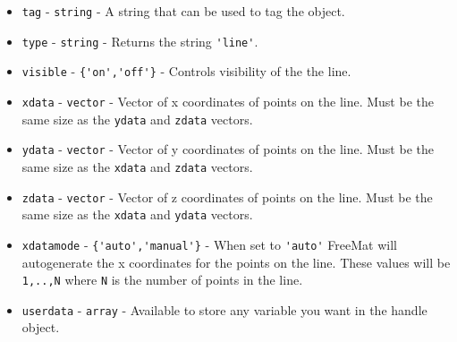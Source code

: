 \begin{itemize}
\item  \verb|tag| - \verb|string| - A string that can be used to tag the object.

\item  \verb|type| - \verb|string| - Returns the string \verb|'line'|.

\item  \verb|visible| - \verb|{'on','off'}| - Controls visibility of the the line.

\item  \verb|xdata| - \verb|vector| - Vector of x coordinates of points on the line.  Must be
 the same size as the \verb|ydata| and \verb|zdata| vectors.

\item  \verb|ydata| - \verb|vector| - Vector of y coordinates of points on the line.  Must be
 the same size as the \verb|xdata| and \verb|zdata| vectors.

\item  \verb|zdata| - \verb|vector| - Vector of z coordinates of points on the line.  Must be
 the same size as the \verb|xdata| and \verb|ydata| vectors.

\item  \verb|xdatamode| - \verb|{'auto','manual'}| - When set to \verb|'auto'| FreeMat will autogenerate
 the x coordinates for the points on the line.  These values will be \verb|1,..,N| where
 \verb|N| is the number of points in the line.

\item  \verb|userdata| - \verb|array| - Available to store any variable you
 want in the handle object.

\end{itemize}
